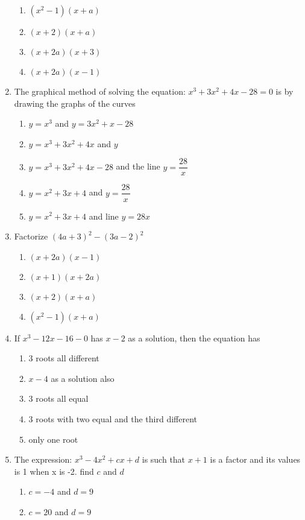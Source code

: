 \begin{multicols}{2}
\begin{enumerate}[label={\arabic*.}]
	\begin{enumerate}[label={\Alph*.}]
	\item \(({x}^{2}-1)(x+a)\)
	\item \((x+2)(x+a)\)
	\item \((x+2a)(x+3)\)
	\item \((x+2a)(x-1)\)
	\end{enumerate}
\item The graphical method of solving the equation: \({x}^{3}+3{x}^{2}+4x-28 = 0\) is by drawing the graphs of the curves
	\begin{enumerate}[label={\Alph*.}]
	\item \(y = {x}^{3}\) and \(y=3{x}^{2} + x -28\)
	\item \(y={x}^{3}+3{x}^{2}+4x\) and \(y\)
	\item \(y={x}^{3}+3{x}^{2}+4x-28\) and the line \(y=\dfrac{28}{x}\)
	\item \(y={x}^{2}+3x+4\) and \(y=\dfrac{28}{x}\)
	\item \(y={x}^{2}+3x+4\) and line \(y=28x\)
	\end{enumerate}
\item Factorize \((4a+3)^2-(3a-2)^2\)
	\begin{enumerate}[label={\Alph*.}]
	\item \((x+2a)(x-1)\)
	\item \((x+1)(x+2a)\)
	\item \((x+2)(x+a)\)
	\item \(({x}^{2}-1)(x+a)\)
	\end{enumerate}
\item If \({x}^{3} - 12x - 16 - 0\) has \(x-2\) as a solution, then the equation has
	\begin{enumerate}[label={\Alph*.}]
	\item 3 roots all different
	\item \(x-4\) as a solution also
	\item 3 roots all equal
	\item 3 roots with two equal and the third different
	\item only one root
	\end{enumerate}
\item The expression: \({x}^{3}-4{x}^{2}+cx+d\) is such that \(x+1\) is a factor and its values is 1 when x is -2. find \(c\) and \(d\)
	\begin{enumerate}[label={\Alph*.}]
	\item \(c=-4\) and \(d=9\)
	\item \(c=20\) and \(d =9\)

\end{enumerate}
\end{enumerate}
\end{multicols}
